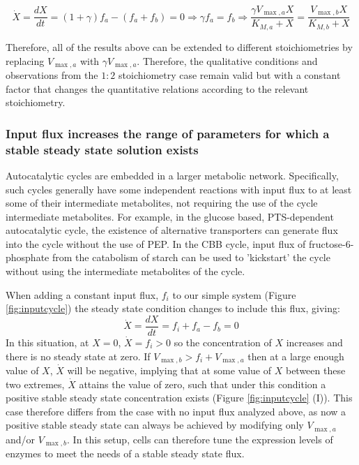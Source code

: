     \begin{equation*}
      \dot X = \frac{dX}{dt} = (1+\gamma)f_a - (f_a + f_b) = 0 \Rightarrow \gamma f_a = f_b \Rightarrow \frac{\gamma V_{\max,a}X}{K_{M,a}+X}=\frac{V_{\max,b}X}{K_{M,b}+X}
    \end{equation*}

    Therefore, all of the results above can be extended to different stoichiometries by replacing $V_{\max,a}$ with $\gamma V_{\max,a}$.
    Therefore, the qualitative conditions and observations from the $1:2$ stoichiometry case remain valid but with a constant factor that changes the quantitative relations according to the relevant stoichiometry.
\subsubsection{Input flux increases the range of parameters for which a stable steady state solution exists}
    Autocatalytic cycles are embedded in a larger metabolic network.
    Specifically, such cycles generally have some independent reactions with input flux to at least some of their intermediate metabolites, not requiring the use of the cycle intermediate metabolites.
    For example, in the glucose based, PTS-dependent autocatalytic cycle, the existence of alternative transporters can generate flux into the cycle without the use of PEP.
    In the CBB cycle, input flux of fructose-6-phosphate from the catabolism of starch can be used to 'kickstart' the cycle without using the intermediate metabolites of the cycle.

    When adding a constant input flux, $f_i$ to our simple system (Figure \ref{fig:inputcycle}) the steady state condition changes to include this flux, giving:
    \begin{equation*}
      \dot X = \frac{dX}{dt} = f_i + f_a - f_b = 0
    \end{equation*}
    In this situation, at $X=0$, $\dot X=f_i>0$ so the concentration of $X$ increases and there is no steady state at zero.
    If $V_{\max,b}>f_i+V_{\max,a}$ then at a large enough value of $X$, $\dot X$ will be negative, implying that at some value of $X$ between these two extremes, $\dot{X}$ attains the value of zero, such that under this condition a positive stable steady state concentration exists (Figure \ref{fig:inputcycle} (I)).
    This case therefore differs from the case with no input flux analyzed above, as now a positive stable steady state can always be achieved by modifying only $V_{\max,a}$ and/or $V_{\max,b}$.
    In this setup, cells can therefore tune the expression levels of enzymes to meet the needs of a stable steady state flux.

